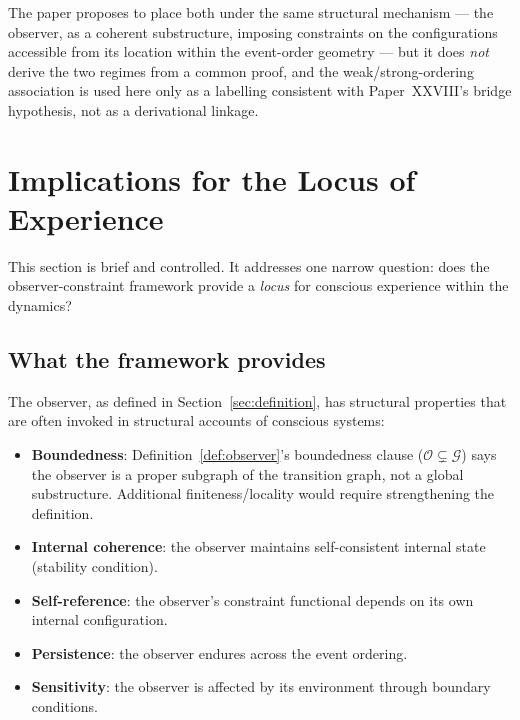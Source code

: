 \documentclass[12pt]{article}
\newcommand{\Gcal}{\mathcal{G}}
\newcommand{\Ocal}{\mathcal{O}}
\begin{document}
The paper proposes to place both under the same structural mechanism --- the observer, as a coherent substructure, imposing constraints on the configurations accessible from its location within the event-order geometry --- but it does \emph{not} derive the two regimes from a common proof, and the weak/strong-ordering association is used here only as a labelling consistent with Paper~XXVIII's bridge hypothesis, not as a derivational linkage.

\section{Implications for the Locus of Experience}\label{sec:consciousness}

This section is brief and controlled. It addresses one narrow question: does the observer-constraint framework provide a \textit{locus} for conscious experience within the dynamics?

\subsection{What the framework provides}

The observer, as defined in Section~\ref{sec:definition}, has structural properties that are often invoked in structural accounts of conscious systems:

\begin{itemize}
    \item \textbf{Boundedness}: Definition~\ref{def:observer}'s boundedness clause ($\Ocal \subsetneq \Gcal$) says the observer is a proper subgraph of the transition graph, not a global substructure. Additional finiteness/locality would require strengthening the definition.
    \item \textbf{Internal coherence}: the observer maintains self-consistent internal state (stability condition).
    \item \textbf{Self-reference}: the observer's constraint functional depends on its own internal configuration.
    \item \textbf{Persistence}: the observer endures across the event ordering.
    \item \textbf{Sensitivity}: the observer is affected by its environment through boundary conditions.
\end{itemize}
\end{document}
